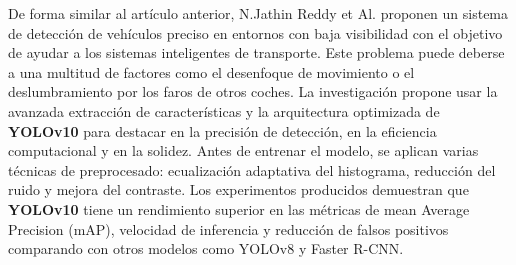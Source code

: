 \documentclass[11pt]{article}
\begin{document}
De forma similar al artículo anterior, N.Jathin Reddy et Al.\cite{articleReddy} proponen un sistema de detección de vehículos preciso en entornos con baja visibilidad con el objetivo de ayudar a los sistemas inteligentes de transporte. Este problema puede deberse a una multitud de factores como el desenfoque de movimiento o el deslumbramiento por los faros de otros coches. La investigación propone usar la avanzada extracción de características y la arquitectura optimizada de \textbf{YOLOv10} para destacar en la precisión de detección, en la eficiencia computacional y en la solidez. Antes de entrenar el modelo, se aplican varias técnicas de preprocesado: ecualización adaptativa del histograma, reducción del ruido y mejora del contraste. Los experimentos producidos demuestran que \textbf{YOLOv10} tiene un rendimiento superior en las métricas de mean Average Precision (mAP), velocidad de inferencia y reducción de falsos positivos comparando con otros modelos como YOLOv8 y Faster R-CNN.
\end{document}
